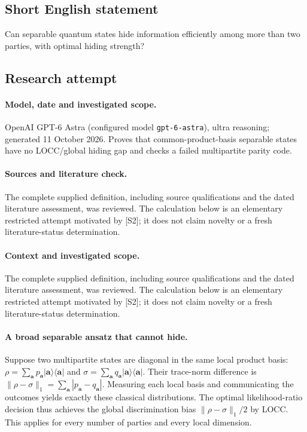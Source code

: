 \documentclass[11pt]{article}
\begin{document}
\subsection{Short English statement}
Can separable quantum states hide information efficiently among more than two parties, with optimal hiding strength?
\subsection{Research attempt}
\paragraph{Model, date and investigated scope.}
OpenAI GPT-6 Astra (configured model \texttt{gpt-6-astra}), ultra reasoning; generated 11 October 2026. Proves that common-product-basis separable states have no LOCC/global hiding gap and checks a failed multipartite parity code.

\paragraph{Sources and literature check.}
The complete supplied definition, including source qualifications and the dated literature assessment, was reviewed. The calculation below is an elementary restricted attempt motivated by [S2]; it does not claim novelty or a fresh literature-status determination.

\paragraph{Context and investigated scope.} The complete supplied definition, including source qualifications and the dated literature assessment, was reviewed. The calculation below is an elementary restricted attempt motivated by [S2]; it does not claim novelty or a fresh literature-status determination.

\paragraph{A broad separable ansatz that cannot hide.} Suppose two multipartite states are diagonal in the same local product basis: $\rho=\sum_{\mathbf a}p_{\mathbf a}|\mathbf a\rangle\langle\mathbf a|$ and $\sigma=\sum_{\mathbf a}q_{\mathbf a}|\mathbf a\rangle\langle\mathbf a|$. Their trace-norm difference is $\|\rho-\sigma\|_1=\sum_{\mathbf a}|p_{\mathbf a}-q_{\mathbf a}|$. Measuring each local basis and communicating the outcomes yields exactly these classical distributions. The optimal likelihood-ratio decision thus achieves the global discrimination bias $\|\rho-\sigma\|_1/2$ by LOCC. This applies for every number of parties and every local dimension.
\end{document}
